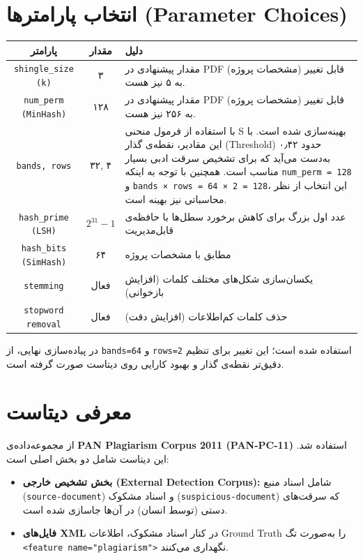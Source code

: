 \documentclass[12pt,a4paper]{article}
\begin{document}
\section{انتخاب پارامترها (Parameter Choices)}

\begin{center}
\begin{tabular}{|c|c|p{7cm}|}
\hline
\textbf{پارامتر} & \textbf{مقدار} & \textbf{دلیل} \\
\hline
\texttt{shingle\_size (k)} & ۳ & مقدار پیشنهادی در PDF (مشخصات پروژه) قابل تغییر به ۵ نیز هست. \\
\hline
\texttt{num\_perm (MinHash)} & ۱۲۸ & مقدار پیشنهادی در PDF (مشخصات پروژه) قابل تغییر به ۲۵۶ نیز هست. \\
\hline
\texttt{bands, rows} & ۳۲, ۴ & با استفاده از فرمول منحنی S بهینه‌سازی شده است. با این مقادیر، نقطه‌ی گذار (Threshold) حدود ۰٫۴۲ به‌دست می‌آید که برای تشخیص سرقت ادبی بسیار مناسب است. همچنین با توجه به اینکه \texttt{num\_perm = 128} و \texttt{bands × rows = 64 × 2 = 128}، این انتخاب از نظر محاسباتی نیز بهینه است. \\
\hline
\texttt{hash\_prime (LSH)} & $2^{31}-1$ & عدد اول بزرگ برای کاهش برخورد سطل‌ها با حافظه‌ی قابل‌مدیریت \\
\hline
\texttt{hash\_bits (SimHash)} & ۶۴ & مطابق با مشخصات پروژه \\
\hline
\texttt{stemming} & فعال & یکسان‌سازی شکل‌های مختلف کلمات (افزایش بازخوانی) \\
\hline
\texttt{stopword removal} & فعال & حذف کلمات کم‌اطلاعات (افزایش دقت) \\
\hline
\end{tabular}
\end{center}

در پیاده‌سازی نهایی، از \texttt{bands=64} و \texttt{rows=2} استفاده شده است؛ این تغییر برای تنظیم دقیق‌تر نقطه‌ی گذار و بهبود کارایی روی دیتاست صورت گرفته است.

\section{معرفی دیتاست}

از مجموعه‌داده‌ی \textbf{PAN Plagiarism Corpus 2011 (PAN-PC-11)} استفاده شد. این دیتاست شامل دو بخش اصلی است:

\begin{itemize}
    \item \textbf{بخش تشخیص خارجی (External Detection Corpus):} شامل اسناد منبع (\texttt{source-document}) و اسناد مشکوک (\texttt{suspicious-document}) که سرقت‌های دستی (توسط انسان) در آن‌ها جاسازی شده است.
    \item \textbf{فایل‌های XML} در کنار اسناد مشکوک، اطلاعات Ground Truth را به‌صورت تگ \texttt{<feature name="plagiarism">} نگهداری می‌کنند.
\end{itemize}
\end{document}
